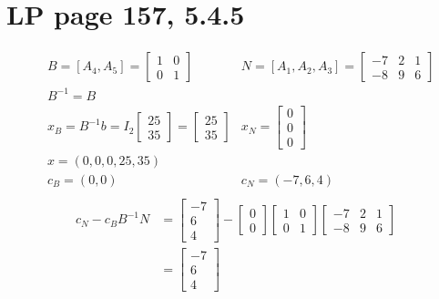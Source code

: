 \documentclass[11pt]{article}
\begin{document}
\section{LP page 157, 5.4.5}
\begin{align*}
    & B = [A_4, A_5] = \begin{bmatrix} 1 & 0 \\ 0 & 1\end{bmatrix} & N = [A_1, A_2, A_3] = \begin{bmatrix} -7 & 2 & 1 \\ -8 & 9 & 6\end{bmatrix} \\
    & B^{-1} = B \\
    & x_B = B^{-1}b = I_2 \begin{bmatrix} 25 \\ 35 \end{bmatrix} = \begin{bmatrix} 25 \\ 35 \end{bmatrix} & x_N = \begin{bmatrix} 0 \\ 0 \\ 0 \end{bmatrix} \\
    & x = (0, 0, 0, 25, 35) \\
    & c_B = (0, 0) & c_N = (-7, 6, 4) \\
\end{align*}
\begin{align*}
    c_N - c_B B^{-1}N &= \begin{bmatrix} -7 \\ 6 \\ 4 \end{bmatrix}  - \begin{bmatrix} 0 \\ 0 \end{bmatrix} \begin{bmatrix} 1 & 0 \\ 0 & 1 \end{bmatrix} \begin{bmatrix} -7 & 2 & 1 \\ -8 & 9 & 6\end{bmatrix} \\
    &= \begin{bmatrix} -7 \\ 6 \\ 4 \end{bmatrix}
\end{align*}
\end{document}
